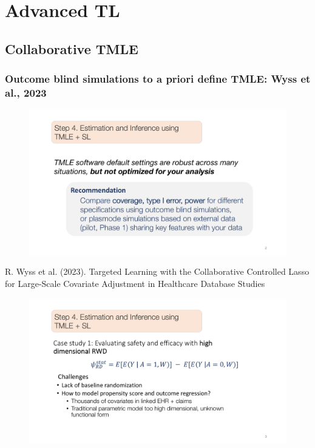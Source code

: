 \documentclass[t]{beamer}
\begin{document}
\section{Advanced TL}

\subsection{Collaborative TMLE}

\begin{frame}
\frametitle{Outcome blind simulations to a priori define TMLE: Wyss et al., 2023}
\centering
\begin{figure}
\begin{center}
\includegraphics[width=1.02\textwidth]{figures/abbviepdfslides_2.pdf}
\end{center}
\end{figure}
{\small R. Wyss et al. (2023). Targeted Learning with the Collaborative
Controlled Lasso for Large-Scale Covariate Adjustment in Healthcare Database
Studies}
\end{frame}

\begin{frame}
\centering
\begin{figure}
\begin{center}
\includegraphics[width=1.02\textwidth]{figures/abbviepdfslides_3.pdf}
\end{center}
\end{figure}
\end{frame}
\end{document}
